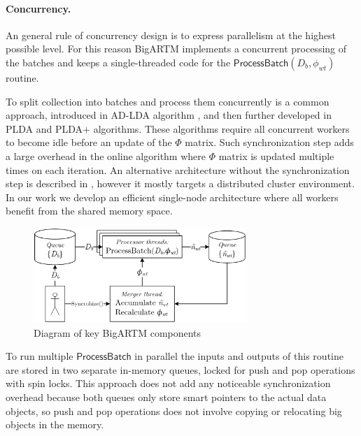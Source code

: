 \documentclass[russian]{llncs}
\newcommand{\kw}[1]{\textsf{#1}}
\begin{document}
\paragraph{Concurrency.}
An general rule of concurrency design is to express parallelism at the highest possible level.
For this reason BigARTM implements a concurrent processing of the batches
and keeps a single-threaded code for the $\kw{ProcessBatch}(D_b, \phi_{wt})$ routine.

To split collection into batches and process them concurrently is a common approach,
introduced in AD-LDA algorithm \cite{newman2009distributed}, and
then further developed in PLDA \cite{wang2009plda} and PLDA{+} \cite{liu2011plda+} algorithms.
These algorithms require all concurrent workers to become idle before an update of the $\Phi$ matrix.
Such synchronization step adds a large overhead in the online algorithm where $\Phi$ matrix is updated multiple times on each iteration.
An alternative architecture without the synchronization step is described in \cite{smola2010architecture},
however it mostly targets a distributed cluster environment.
In our work we develop an efficient single-node architecture where all workers benefit from the shared memory space.

\begin{figure}[t]
\begin{centering}
\includegraphics[height=36mm]{diagramm_artm_core.eps}
\caption{Diagram of key BigARTM components}
\label{fig:diagramm_artm_core}
\end{centering}
\end{figure}

To run multiple $\kw{ProcessBatch}$ in parallel the inputs and outputs of this routine are stored in two separate in-memory queues,
locked for push and pop operations with spin locks.
This approach does not add any noticeable synchronization overhead because
both queues only store smart pointers to the actual data objects,
so push and pop operations does not involve copying or relocating big objects in the memory.
\end{document}
